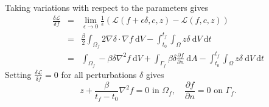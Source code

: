 \documentclass[12pt, letterpaper]{article}
\newcommand{\dA}{{\:\textrm{d}A}}
\newcommand{\dV}{{\:\textrm{d}V}}
\newcommand{\dt}{{\:\textrm{d}t}}
\begin{document}
Taking variations with respect to the parameters gives
\begin{eqnarray*}
\frac{\delta\mathcal{L}}{\delta f} &=& \lim_{\epsilon\to0}\frac{1}{\epsilon}(\mathcal{L}(f+\epsilon\delta,c,z)-\mathcal{L}(f,c,z)) \\
&=& \frac{\beta}{2}\int_{\Omega_f} 2\nabla\delta\cdot\nabla f \dV - \int_{t_0}^{t_f}\int_\Omega z\delta \dV\dt \\
&=& \int_{\Omega_f}-\beta\delta\nabla^2 f \dV + \int_{\Gamma_f}\beta\delta\frac{\partial f}{\partial n} \dA-\int_{t_0}^{t_f}\int_\Omega z\delta \dV\dt
\end{eqnarray*}
Setting $\frac{\delta\mathcal{L}}{\delta f}=0$ for all perturbations $\delta$ gives
\[
z+\frac{\beta}{t_f-t_0}\nabla^2f=0\textrm{ in }\Omega_f,\quad\frac{\partial f}{\partial n}=0\textrm{ on }\Gamma_f.
\]
\end{document}
